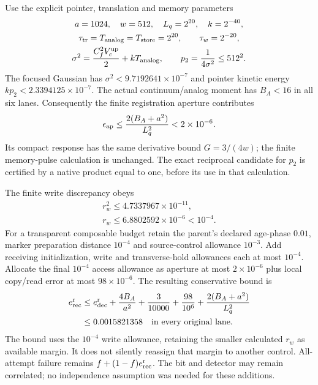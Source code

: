 Use the explicit pointer, translation and memory parameters
\begin{equation}
\begin{gathered}
 a=1024,\quad w=512,\quad L_q=2^{20},\quad k=2^{-40},\\
 \tau_{\rm tr}=T_{\rm analog}=T_{\rm store}=2^{20},
 \qquad \tau_w=2^{-20},\\
 \sigma^2=\frac{C_f^2V_c^{\rm up}}2+kT_{\rm analog},\qquad
 p_2=\frac1{4\sigma^2}\leq512^2 .
\end{gathered}
\label{eq:chvirec-example}
\end{equation}
The focused Gaussian has
\(\sigma^2<9.7192641\times10^{-7}\) and
pointer kinetic energy \(kp_2<2.3394125\times10^{-7}\).
The actual continuum/analog moment has \(B_A<16\) in all six lanes.
Consequently the finite registration aperture contributes
\begin{equation}
 \epsilon_{\rm ap}\leq\frac{2(B_A+a^2)}{L_q^2}<2\times10^{-6}.
 \label{eq:chvirec-aperture-number}
\end{equation}
Its compact response has the same derivative bound \(G=3/(4w)\);
the finite memory-pulse calculation is unchanged. The exact reciprocal
candidate for \(p_2\) is certified by a native product equal to one,
before its use in that calculation.

The finite write discrepancy obeys
\begin{equation}
\begin{gathered}
r_w^2\leq4.7337967\times10^{-11},
 \\
 r_w\leq6.8802592\times10^{-6}<10^{-4}.
\end{gathered}
\label{eq:chvirec-write-number}
\end{equation}
For a transparent composable budget retain the parent's declared
age-phase \(0.01\), marker preparation distance \(10^{-4}\) and
source-control allowance \(10^{-3}\). Add receiving initialization,
write and transverse-hold allowances each at most \(10^{-4}\).
Allocate the final \(10^{-4}\) access allowance as aperture at most
\(2\times10^{-6}\) plus local copy/read error at most \(98\times10^{-6}\).
The resulting conservative bound is
\begin{equation}
 \begin{aligned}
 e_{\rm rec}^{\rm r}
 &\leq e_{\rm dec}^{\rm r}+\frac{4B_A}{a^2}
       +\frac3{10000}+\frac{98}{10^6}
       +\frac{2(B_A+a^2)}{L_q^2}\\
 &\leq0.0015821358\quad\hbox{in every original lane}.
 \end{aligned}
 \label{eq:chvirec-numerical-ready}
\end{equation}
The bound uses the \(10^{-4}\) write allowance, retaining the smaller
calculated \(r_w\) as available margin. It does not silently reassign that
margin to another control. All-attempt failure remains
\(f+(1-f)e_{\rm rec}^{\rm r}\). The bit and detector may remain correlated;
no independence assumption was needed for these additions.

